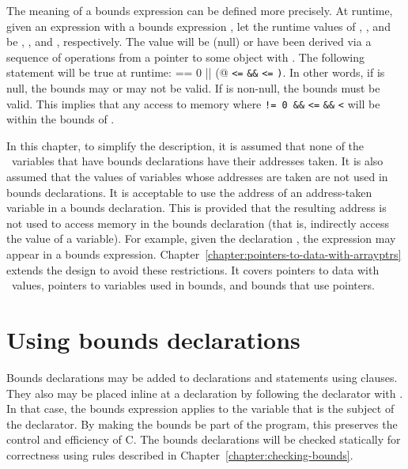 The meaning of a bounds expression can be defined more precisely. At
runtime, given an expression  with a bounds expression
, let the runtime
values of , , and  be , ,
and , respectively. The value  will be  (null) or
have been derived via a sequence of operations from a pointer to some
object  with .
The following statement will be true at runtime:
 \lstinline@== 0 || (@ \lstinline|<=|  \lstinline|&&|
 \lstinline|<=| \lstinline|)|. In other words,
if  is null, the bounds
may or may not be valid. If  is non-null, the bounds must be
valid. This implies that any access to memory where 
\lstinline|!= 0 &&|  \lstinline|<=|  \lstinline|&&| 
\lstinline|<|  will be within the bounds of .

In this chapter, to simplify the description, it is assumed that none of
the \arrayptr\ variables that have bounds declarations have
their addresses taken. It is also assumed that the values of variables
whose addresses are taken are not used in bounds declarations. It is
acceptable to use the address of an address-taken variable in a bounds
declaration. This is provided that the resulting address is not used to
access memory in the bounds declaration (that is, indirectly access the
value of a variable). For example, given the declaration ,
the expression  may appear in a bounds expression.
Chapter~\ref{chapter:pointers-to-data-with-arrayptrs} extends the
design to avoid these restrictions.  It covers pointers to data with
\arrayptr\ values,  pointers to variables used in bounds, and bounds
that use pointers.

\section{Using bounds declarations}

Bounds declarations may be added to declarations and statements using
 clauses. They also may be placed inline at a declaration
by following the declarator with \code{:} . In that
case, the bounds expression applies to the variable that is the subject
of the declarator. By making the bounds be part of the program, this
preserves the control and efficiency of C. The bounds declarations will
be checked statically for correctness using rules described in
Chapter~\ref{chapter:checking-bounds}.


